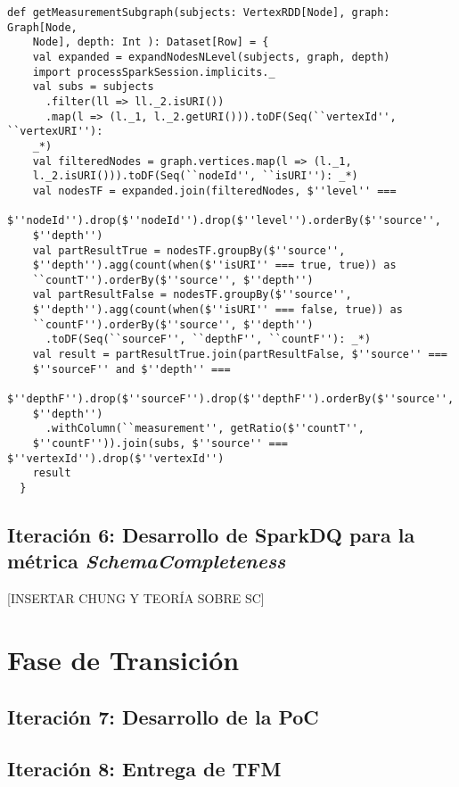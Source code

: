 \lstset{escapechar=@,language=scala}
\begin{lstlisting}[caption={Expansión de un conjunto de nodos por niveles},captionpos=b, label=graphexpand]
  def getMeasurementSubgraph(subjects: VertexRDD[Node], graph: Graph[Node,
    Node], depth: Int ): Dataset[Row] = {
    val expanded = expandNodesNLevel(subjects, graph, depth)
    import processSparkSession.implicits._
    val subs = subjects
      .filter(ll => ll._2.isURI())
      .map(l => (l._1, l._2.getURI())).toDF(Seq(``vertexId'', ``vertexURI''):
    _*)
    val filteredNodes = graph.vertices.map(l => (l._1,
    l._2.isURI())).toDF(Seq(``nodeId'', ``isURI''): _*)
    val nodesTF = expanded.join(filteredNodes, $''level'' ===
    $''nodeId'').drop($''nodeId'').drop($''level'').orderBy($''source'',
    $''depth'')
    val partResultTrue = nodesTF.groupBy($''source'',
    $''depth'').agg(count(when($''isURI'' === true, true)) as
    ``countT'').orderBy($''source'', $''depth'')
    val partResultFalse = nodesTF.groupBy($''source'',
    $''depth'').agg(count(when($''isURI'' === false, true)) as
    ``countF'').orderBy($''source'', $''depth'')
      .toDF(Seq(``sourceF'', ``depthF'', ``countF''): _*)
    val result = partResultTrue.join(partResultFalse, $''source'' ===
    $''sourceF'' and $''depth'' ===
    $''depthF'').drop($''sourceF'').drop($''depthF'').orderBy($''source'',
    $''depth'')
      .withColumn(``measurement'', getRatio($''countT'',
    $''countF'')).join(subs, $''source'' === $''vertexId'').drop($''vertexId'')
    result
  }
\end{lstlisting}


\subsection{Iteración 6: Desarrollo de SparkDQ para la métrica \textit{SchemaCompleteness}}



[INSERTAR CHUNG Y TEORÍA SOBRE SC]

\section{Fase de Transición}

\subsection{Iteración 7: Desarrollo de la PoC}



\subsection{Iteración 8: Entrega de TFM}


